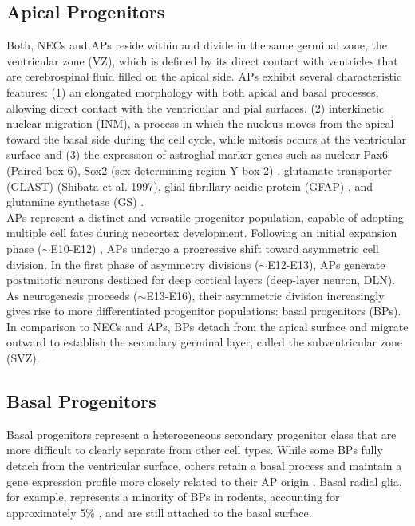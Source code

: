 \subsection{Apical Progenitors}
Both, NECs and APs reside within and divide in the same germinal zone, the ventricular zone (\gls{VZ}), which is defined by its direct contact with ventricles that are cerebrospinal fluid filled on the apical side. APs exhibit several characteristic features: (1) an elongated 
morphology with both apical and basal processes, allowing direct contact with the ventricular and pial surfaces. (2) interkinetic nuclear migration (INM), a process in which the nucleus moves from the apical toward the basal side during the cell cycle, while mitosis occurs at the ventricular surface and (3) the expression of astroglial marker genes such as nuclear Pax6 (Paired box 6), Sox2 (sex determining region Y-box 2) \citep{GOTZPax6ControlsRadial1998}, glutamate transporter (GLAST) (Shibata et al. 1997), glial fibrillary acidic protein (GFAP)
\citep{LEVITTImmunoperoxidaseLocalizationGlial1980}, and  glutamine synthetase (\gls{GS}) \citep{ENGLUNDPax6Tbr2Tbr12005}.
\\

APs represent a distinct and versatile progenitor population, capable of adopting multiple cell fates during neocortex development. Following an initial expansion phase ($\sim$E10-E12) , APs undergo a progressive shift toward asymmetric cell division. In the first phase of asymmetry divisions ($\sim$E12-E13), APs generate postmitotic neurons destined for deep cortical layers (deep-layer neuron, \gls{DLN}). \newline
\\

As neurogenesis proceeds ($\sim$E13-E16), their asymmetric division increasingly gives rise to more differentiated progenitor populations: basal progenitors (\glspl{BP}).
In comparison to NECs and APs, BPs detach from the apical surface and migrate outward to establish the secondary germinal layer, called the subventricular zone (\gls{SVZ}).


\subsection{Basal Progenitors}

Basal progenitors represent a heterogeneous secondary progenitor class that are more difficult to clearly separate from other cell types. While some BPs fully detach from the ventricular surface, others retain a basal process and maintain a gene expression profile more closely related to their AP origin \citep{pilzAmplificationProgenitorsMammalian2013}. 
Basal radial glia, for example, represents a minority of BPs in rodents, accounting for approximately 5\% \citep{MARTINEZ-CERDENOComparativeAnalysisSubventricular2012}, and are still attached to the basal surface. 
\\

